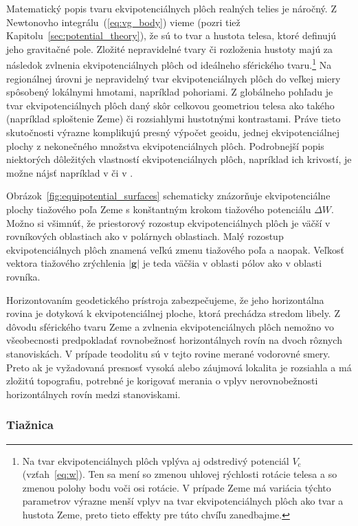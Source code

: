 \documentclass[a4paper, 12pt]{book}
\newcommand{\cidx}{\mathrm c}
\let\vec\mathbf
\begin{document}
Matematický popis tvaru ekvipotenciálnych plôch realných telies je náročný.  
Z Newtonovho integrálu~(\ref{eq:vg_body}) vieme (pozri tiež 
Kapitolu~\ref{sec:potential_theory}), že sú to tvar a hustota telesa, ktoré 
definujú jeho gravitačné pole.  Zložité nepravidelné tvary či rozloženia 
hustoty majú za následok zvlnenia ekvipotenciálnych plôch od ideálneho 
sférického tvaru.\footnote{Na tvar ekvipotenciálnych plôch vplýva aj odstredivý 
potenciál $V_\cidx$ (vzťah~\ref{eq:w}).  Ten sa mení so zmenou uhlovej 
rýchlosti rotácie telesa a so zmenou polohy bodu voči osi rotácie.  V prípade 
Zeme má variácia týchto parametrov výrazne menší vplyv na tvar 
ekvipotenciálnych plôch ako tvar a hustota Zeme, preto tieto effekty pre túto 
chvíľu zanedbajme.}  Na regionálnej úrovni je nepravidelný tvar 
ekvipotenciálnych plôch do veľkej miery spôsobený lokálnymi hmotami, napríklad 
pohoriami.  Z globálneho pohľadu je tvar ekvipotenciálnych plôch daný skôr 
celkovou geometriou telesa ako takého (napríklad sploštenie Zeme) či 
rozsiahlymi hustotnými kontrastami.  Práve tieto skutočnosti výrazne komplikujú 
presný výpočet geoidu, jednej ekvipotenciálnej plochy z nekonečného množstva 
ekvipotenciálnych plôch.  Podrobnejší popis niektorých dôležitých vlastností 
ekvipotenciálnych plôch, napríklad ich krivostí, je možne nájsť napríklad 
v \cite{Janak2006} či v \cite{MoritzPhysicalGeodesy}.

Obrázok~\ref{fig:equipotential_surfaces} schematicky znázorňuje ekvipotenciálne 
plochy tiažového poľa Zeme s konštantným krokom tiažového potenciálu $\Delta 
W$.  Možno si všimnúť, že priestorový rozostup ekvipotenciálnych plôch je väčší 
v rovníkových oblastiach ako v polárnych oblastiach.  Malý rozostup 
ekvipotenciálnych plôch znamená veľkú zmenu tiažového poľa a naopak.  Veľkosť 
vektora tiažového zrýchlenia $| \vec g |$ je teda väčšia v oblasti pólov ako 
v oblasti rovníka.

Horizontovaním geodetického prístroja zabezpečujeme, že jeho horizontálna 
rovina je dotyková k ekvipotenciálnej ploche, ktorá prechádza stredom libely.  
Z dôvodu sférického tvaru Zeme a zvlnenia ekvipotenciálnych plôch nemožno vo 
všeobecnosti predpokladať rovnobežnosť horizontálnych rovín na dvoch rôznych 
stanoviskách.  V prípade teodolitu sú v tejto rovine merané vodorovné smery.  
Preto ak je vyžadovaná presnosť vysoká alebo záujmová lokalita je rozsiahla 
a má zložitú topografiu, potrebné je korigovať merania o vplyv nerovnobežnosti 
horizontálnych rovín medzi stanoviskami.

\subsubsection{Tiažnica}
\end{document}
